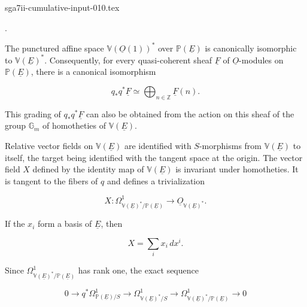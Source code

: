\begin{filecontents*}{sga7ii-cumulative-input-010.tex}
\begin{center}
\qquad .
\end{center}

The punctured affine space $\mathbb V(\underline O(1))^*$ over
$\mathbb P(\underline E)$ is canonically isomorphic to
$\mathbb V(\underline E)^*$.  Consequently, for every quasi-coherent sheaf
$\underline F$ of $\underline O$-modules on $\mathbb P(\underline E)$, there
is a canonical isomorphism


\begin{equation}\tag{1.1.1}
q_*q^*\underline F\simeq
\bigoplus_{n\in\mathbb Z}\underline F(n).
\end{equation}

This grading of $q_*q^*\underline F$ can also be obtained from the action on
this sheaf of the group $\mathbb G_m$ of homotheties of
$\mathbb V(\underline E)$.

Relative vector fields on $\mathbb V(\underline E)$ are identified with
$S$-morphisms from $\mathbb V(\underline E)$ to itself, the target being
identified with the tangent space at the origin.  The vector field $X$ defined
by the identity map of $\mathbb V(\underline E)$ is invariant under
homotheties.  It is tangent to the fibers of $q$ and defines a trivialization

\begin{equation}\tag{1.1.2}
X:\Omega^1_{\mathbb V(\underline E)^*/\mathbb P(\underline E)}
\longrightarrow\underline O_{\mathbb V(\underline E)^*}.
\end{equation}

If the $x_i$ form a basis of $\underline E$, then

\begin{equation*}
X=\sum_i x_i\,dx^i.
\end{equation*}

Since $\Omega^1_{\mathbb V(\underline E)^*/\mathbb P(\underline E)}$ has
rank one, the exact sequence

\begin{equation*}
0\longrightarrow q^*\Omega^1_{\mathbb P(\underline E)/S}
\longrightarrow\Omega^1_{\mathbb V(\underline E)^*/S}
\longrightarrow
\Omega^1_{\mathbb V(\underline E)^*/\mathbb P(\underline E)}
\longrightarrow0
\end{equation*}


\end{filecontents*}
